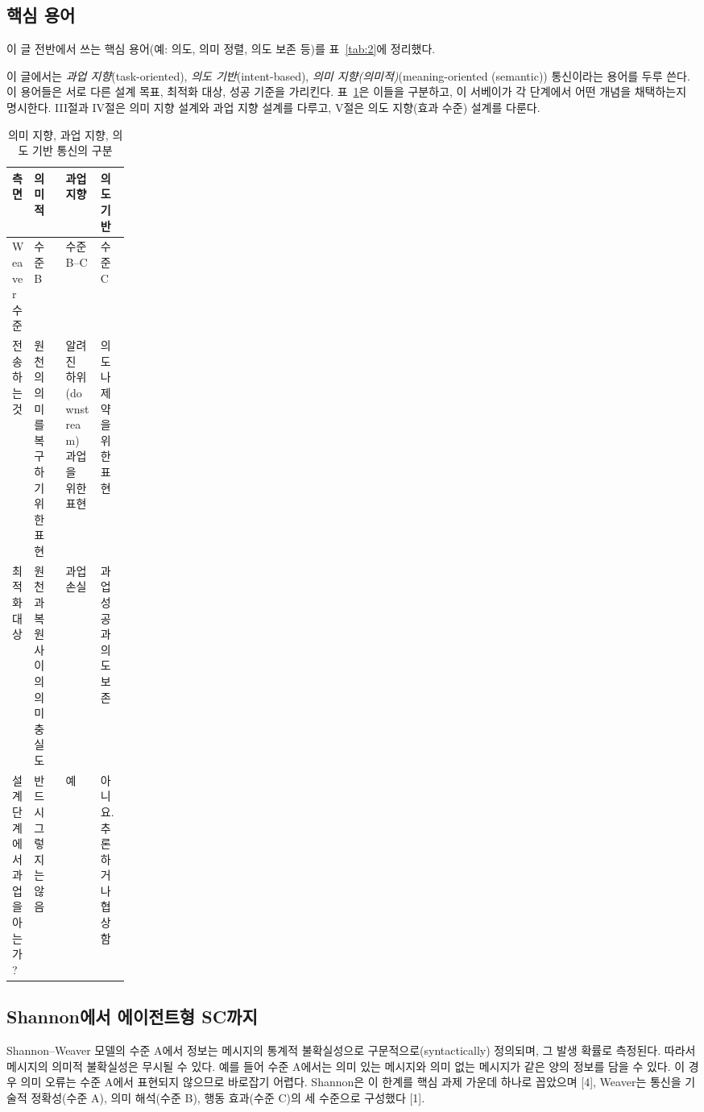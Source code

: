 \subsection{핵심 용어}
이 글 전반에서 쓰는 핵심 용어(예: 의도, 의미 정렬, 의도 보존 등)를 표~\ref{tab:2}에 정리했다.

이 글에서는 \emph{과업 지향}(task-oriented), \emph{의도 기반}(intent-based), \emph{의미 지향(의미적)}(meaning-oriented (semantic)) 통신이라는 용어를 두루 쓴다. 이 용어들은 서로 다른 설계 목표, 최적화 대상, 성공 기준을 가리킨다. 표~\ref{tab:3}은 이들을 구분하고, 이 서베이가 각 단계에서 어떤 개념을 채택하는지 명시한다. III절과 IV절은 의미 지향 설계와 과업 지향 설계를 다루고, V절은 의도 지향(효과 수준) 설계를 다룬다.

\setcounter{table}{2}
\begin{table}[htbp]
\centering
\caption{의미 지향, 과업 지향, 의도 기반 통신의 구분}
\label{tab:3}
\small
\renewcommand{\arraystretch}{1.2}
\begin{tabularx}{\linewidth}{|>{\centering\arraybackslash}p{0.17\linewidth}|>{\centering\arraybackslash}X|>{\centering\arraybackslash}X|>{\centering\arraybackslash}X|}
\hline
\textbf{측면} & \textbf{의미적} & \textbf{과업 지향} & \textbf{의도 기반} \\
\hline
Weaver 수준 & 수준 B & 수준 B--C & 수준 C \\
\hline
전송하는 것 & 원천의 의미를 복구하기 위한 표현 & 알려진 하위(downstream) 과업을 위한 표현 & 의도나 제약을 위한 표현 \\
\hline
최적화 대상 & 원천과 복원 사이의 의미 충실도 & 과업 손실 & 과업 성공과 의도 보존 \\
\hline
설계 단계에서 과업을 아는가? & 반드시 그렇지는 않음 & 예 & 아니요. 추론하거나 협상함 \\
\hline
\end{tabularx}
\end{table}

\subsection{Shannon에서 에이전트형 SC까지}
Shannon--Weaver 모델의 수준 A에서 정보는 메시지의 통계적 불확실성으로 구문적으로(syntactically) 정의되며, 그 발생 확률로 측정된다. 따라서 메시지의 의미적 불확실성은 무시될 수 있다. 예를 들어 수준 A에서는 의미 있는 메시지와 의미 없는 메시지가 같은 양의 정보를 담을 수 있다. 이 경우 의미 오류는 수준 A에서 표현되지 않으므로 바로잡기 어렵다. Shannon은 이 한계를 핵심 과제 가운데 하나로 꼽았으며 [4], Weaver는 통신을 기술적 정확성(수준 A), 의미 해석(수준 B), 행동 효과(수준 C)의 세 수준으로 구성했다 [1].

